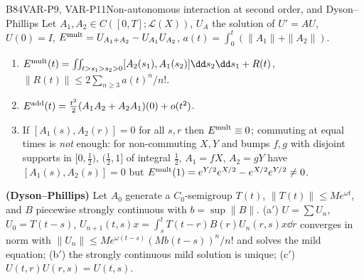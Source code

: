 \begin{dimcard}{B84}{VAR-P9, VAR-P11}{Non-autonomous interaction at second order, and Dyson--Phillips}{\proved}{}
Let $A_1,A_2\in C([0,T];\mathcal L(X))$, $U_A$ the solution of $U'=AU$, $U(0)=I$, $E^{\rm mult}=U_{A_1+A_2}-U_{A_1}U_{A_2}$, $a(t)=\int_0^t(\|A_1\|+\|A_2\|)$.
\begin{enumerate}[label=(\alph*)]
\item $E^{\rm mult}(t)=\iint_{t>s_1>s_2>0}[A_2(s_1),A_1(s_2)]\dd s_2\dd s_1+R(t)$, $\|R(t)\|\le2\sum_{n\ge3}a(t)^n/n!$.
\item $E^{\rm add}(t)=\frac{t^2}2(A_1A_2+A_2A_1)(0)+o(t^2)$.
\item If $[A_1(s),A_2(r)]=0$ for all $s,r$ then $E^{\rm mult}\equiv0$; commuting at equal times is \emph{not} enough: for non-commuting $X,Y$ and bumps $f,g$ with disjoint supports in $[0,\tfrac12)$, $(\tfrac12,1]$ of integral $\tfrac12$, $A_1=fX$, $A_2=gY$ have $[A_1(s),A_2(s)]=0$ but $E^{\rm mult}(1)=e^{Y/2}e^{X/2}-e^{X/2}e^{Y/2}\ne0$.
\end{enumerate}
\textbf{(Dyson--Phillips)} Let $A_0$ generate a $C_0$-semigroup $T(t)$, $\|T(t)\|\le Me^{\omega t}$, and $B$ piecewise strongly continuous with $b=\sup\|B\|$. (a$'$) $U=\sum U_n$, $U_0=T(t-s)$, $U_{n+1}(t,s)x=\int_s^tT(t-r)B(r)U_n(r,s)x\dd r$ converges in norm with $\|U_n\|\le Me^{\omega(t-s)}(Mb(t-s))^n/n!$ and solves the mild equation; (b$'$) the strongly continuous mild solution is unique; (c$'$) $U(t,r)U(r,s)=U(t,s)$.
\end{dimcard}

